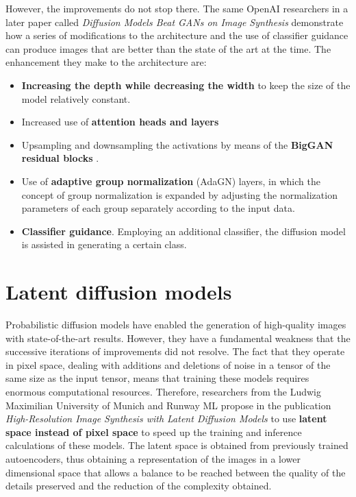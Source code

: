 However, the improvements do not stop there. The same OpenAI researchers in a later paper called \textit{Diffusion Models Beat GANs on Image Synthesis} \cite{dhariwal2021diffusion} demonstrate how a series of modifications to the architecture and the use of classifier guidance can produce images that are better than the state of the art at the time. The enhancement they make to the architecture are:

\begin{itemize}
    \item \textbf{Increasing the depth while decreasing the width} to keep the size of the model relatively constant.
    \item Increased use of \textbf{attention heads and layers}
    \item Upsampling and downsampling the activations by means of the \textbf{BigGAN residual blocks} \cite{brock2018large}.
    \item Use of \textbf{adaptive group normalization} (AdaGN) layers, in which the concept of group normalization is expanded by adjusting the normalization parameters of each group separately according to the input data.
    \item \textbf{Classifier guidance}. Employing an additional classifier, the diffusion model is assisted in generating a certain class.
\end{itemize}

\section{Latent diffusion models} \label{Ldiffusion}

Probabilistic diffusion models have enabled the generation of high-quality images with state-of-the-art results. However, they have a fundamental weakness that the successive iterations of improvements did not resolve. The fact that they operate in pixel space, dealing with additions and deletions of noise in a tensor of the same size as the input tensor, means that training these models requires enormous computational resources. Therefore, researchers from the Ludwig Maximilian University of Munich and Runway ML propose in the publication \textit{High-Resolution Image Synthesis with Latent Diffusion Models} \cite{rombach2022high} to use \textbf{latent space instead of pixel space} to speed up the training and inference calculations of these models. The latent space is obtained from previously trained autoencoders, thus obtaining a representation of the images in a lower dimensional space that allows a balance to be reached between the quality of the details preserved and the reduction of the complexity obtained.

